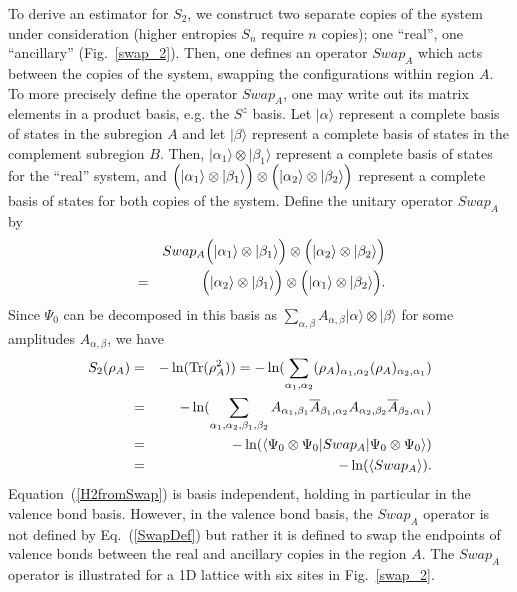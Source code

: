 \documentclass[prl,aps,twocolumn,floatfix,amsmath,amssymb,superscriptaddress,tightenlines]{revtex4}
\begin{document}
To derive an estimator for $S_2$, we construct two separate copies of the
system under consideration (higher entropies $S_n$ require $n$ copies); one ``real'', one ``ancillary'' (Fig.~\ref{swap_2}).
Then, one defines an
operator $Swap_A$ which acts between the copies of the system, swapping the
configurations within region $A$.  To more precisely define the operator
$Swap_A$, one may write out its matrix elements in a product basis, e.g. the $S^z$ basis.
Let $|\alpha\rangle$  represent a complete basis of states in the subregion
$A$ and let $|\beta\rangle$ represent a complete basis of states in
the complement subregion $B$.  Then, $|\alpha_1 \rangle \otimes |\beta_1 \rangle$ represent
a complete basis of states for the ``real'' system, and
$\Bigl( |\alpha_1\rangle \otimes |\beta_1\rangle \Bigr) \otimes
\Bigl( |\alpha_2\rangle \otimes |\beta_2\rangle \Bigr)$
represent a complete basis of states for both copies of the system.
Define the unitary operator $Swap_A$ by
\begin{eqnarray}
\label{SwapDef}
&& Swap_A \Bigl( |\alpha_1\rangle \otimes |\beta_1\rangle \Bigr) \otimes
\Bigl( |\alpha_2\rangle \otimes |\beta_2\rangle \Bigr) \nonumber \\ &=&
\Bigl( |\alpha_2\rangle \otimes |\beta_1\rangle \Bigr) \otimes
\Bigl( |\alpha_1\rangle \otimes |\beta_2\rangle \Bigr).
\end{eqnarray}
Since $\Psi_0$ can be decomposed in this basis as $\sum_{\alpha,\beta} A_{\alpha,\beta} |\alpha\rangle \otimes | \beta \rangle$ for some amplitudes $A_{\alpha,\beta}$, we have
\begin{eqnarray}
\label{H2fromSwap}
S_2(\rho_A) &=&-\ln({\rm Tr}(\rho_A^2)) 
= -\ln(\sum_{\alpha_1,\alpha_2} (\rho_A)_{\alpha_1,\alpha_2}
(\rho_A)_{\alpha_2,\alpha_1}) \nonumber
\\
\nonumber
&=& -\ln(\sum_{\alpha_1,\alpha_2,\beta_1,\beta_2} A_{\alpha_1,\beta_1} \overline A_{\beta_1,\alpha_2} A_{\alpha_2,\beta_2} \overline A_{\beta_2,\alpha_1})
\\ \nonumber
&=&
-\ln(\langle \Psi_0\otimes \Psi_0|Swap_A|\Psi_0\otimes \Psi_0\rangle) 
\nonumber
\\
&=&-\ln(\langle Swap_A \rangle). \label{s2}
\end{eqnarray}
Equation~(\ref{H2fromSwap}) is basis independent, holding in particular in the valence
bond basis.  However, in the valence bond basis, the $Swap_A$ operator is
not defined by Eq.~(\ref{SwapDef}) but rather it is defined to
swap the endpoints of valence bonds between the real and ancillary copies in the region $A$.
The $Swap_A$ operator is illustrated for a 1D lattice with six sites in Fig.~\ref{swap_2}.  
\end{document}
